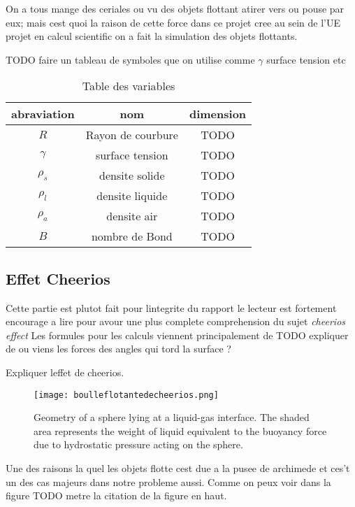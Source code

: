 On a tous mange des ceriales ou vu des objets flottant atirer vers ou pouse par eux; mais cest quoi la raison de cette force dans ce projet cree au sein de l'UE projet en calcul scientific on a fait la simulation des objets flottants.

TODO faire un tableau de symboles que on utilise comme \(\gamma\) surface tension etc

\begin{table}
    \centering
    \begin{tabular}{ccc}
        \hline
        abraviation & nom & dimension\\
        \hline
        $R$      & Rayon de courbure & TODO\\
        $\gamma$ & surface tension   & TODO\\ 
        $\rho_s$ & densite solide    & TODO\\
        $\rho_l$ & densite liquide   & TODO\\
        $\rho_a$ & densite air       & TODO\\
        $B$      & nombre de Bond    & TODO\\
        \hline
    \end{tabular}
    \caption{Table des variables}
\end{table}

\subsection{Effet Cheerios}
    Cette partie est plutot fait pour lintegrite du rapport le lecteur est fortement encourage a lire \cite{vella_cheerios_2005} pour avour une plus complete comprehension du sujet \textit{cheerios effect}
    Les formules pour les calculs viennent principalement de \cite{vella_cheerios_2005}
    TODO expliquer de ou viens les forces des angles qui tord la surface ?

    Expliquer leffet de cheerios.
    
    \begin{figure}
        \texttt{[image: boulleflotantedecheerios.png]}
        \caption{Geometry of a sphere lying at a liquid-gas interface. The shaded area represents the weight of liquid equivalent to the buoyancy force due to hydrostatic pressure acting on the sphere.\cite{vella_cheerios_2005}}
    \end{figure}
    Une des raisons la quel les objets flotte cest due a la pusee de archimede et ces't un des cas majeurs dans notre probleme aussi. Comme on peux voir dans la figure TODO metre la citation de la figure en haut.
    
